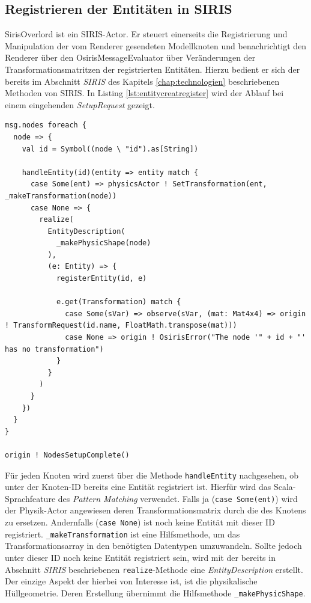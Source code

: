 \subsection{Registrieren der Entitäten in SIRIS}
SirisOverlord ist ein SIRIS-Actor. Er steuert einerseits die Registrierung und Manipulation der vom Renderer gesendeten Modellknoten und benachrichtigt den Renderer über den OsirisMessageEvaluator über Veränderungen der Transformationsmatritzen der registrierten Entitäten. Hierzu bedient er sich der bereits im Abschnitt \textit{SIRIS} des Kapitels \ref{chap:technologien} beschriebenen Methoden von SIRIS. In Listing \ref{lst:entitycreatregister} wird der Ablauf bei einem eingehenden \textit{SetupRequest} gezeigt.
\lstset{language=Scala}
\begin{lstlisting}[caption={Erzeugen und Registrieren einer neuen Entität}, label={lst:entitycreatregister}]
msg.nodes foreach {
  node => {
    val id = Symbol((node \ "id").as[String])

    handleEntity(id)(entity => entity match {
      case Some(ent) => physicsActor ! SetTransformation(ent, _makeTransformation(node))
      case None => {
        realize(
          EntityDescription(
            _makePhysicShape(node)
          ),
          (e: Entity) => {
            registerEntity(id, e)

            e.get(Transformation) match {
              case Some(sVar) => observe(sVar, (mat: Mat4x4) => origin ! TransformRequest(id.name, FloatMath.transpose(mat)))
              case None => origin ! OsirisError("The node '" + id + "' has no transformation")
            }
          }
        )
      }
    })
  }
}

origin ! NodesSetupComplete()
\end{lstlisting}
Für jeden Knoten wird zuerst über die Methode \texttt{handleEntity} nachgesehen, ob unter der Knoten-ID bereits eine Entität registriert ist. Hierfür wird das Scala-Sprachfeature des \textit{Pattern Matching} verwendet. Falls ja (\texttt{case Some(ent)}) wird der Physik-Actor angewiesen deren Transformationsmatrix durch die des Knotens zu ersetzen. Andernfalls (\texttt{case None}) ist noch keine Entität mit dieser ID registriert. \texttt{\_makeTransformation} ist eine Hilfsmethode, um das Transformationsarray in den benötigten Datentypen umzuwandeln. Sollte jedoch unter dieser ID noch keine Entität registriert sein, wird mit der bereits in Abschnitt \textit{SIRIS} beschriebenen \texttt{realize}-Methode eine \textit{EntityDescription} erstellt. Der einzige Aspekt der hierbei von Interesse ist, ist die physikalische Hüllgeometrie. Deren Erstellung übernimmt die Hilfsmethode \texttt{\_makePhysicShape}.

